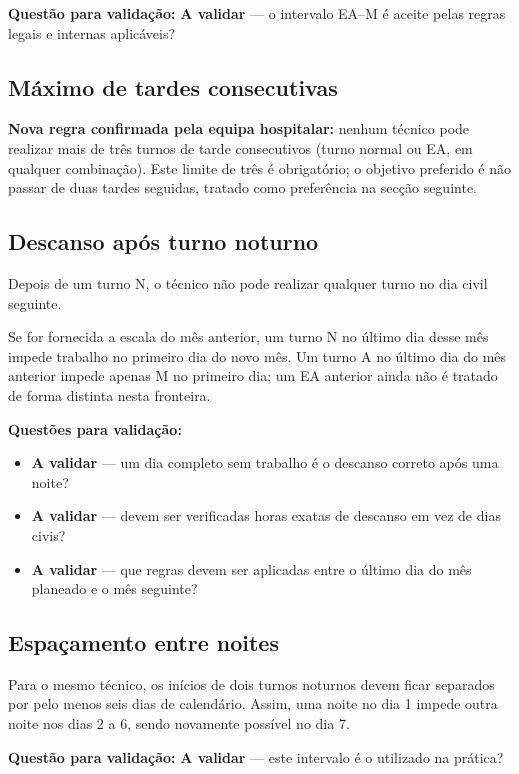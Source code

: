 \documentclass[11pt,a4paper]{article}
\newcommand{\validar}{\textcolor{blue!70!black}{\textbf{A validar}}}
\begin{document}
\textbf{Questão para validação:} \validar{} --- o intervalo EA--M é aceite pelas
regras legais e internas aplicáveis?

\subsection{Máximo de tardes consecutivas}

\textbf{Nova regra confirmada pela equipa hospitalar:} nenhum técnico pode
realizar mais de três turnos de tarde consecutivos (turno normal ou EA, em
qualquer combinação). Este limite de três é obrigatório; o objetivo preferido
é não passar de duas tardes seguidas, tratado como preferência na secção
seguinte.

\subsection{Descanso após turno noturno}

Depois de um turno N, o técnico não pode realizar qualquer turno no dia civil
seguinte.

Se for fornecida a escala do mês anterior, um turno N no último dia desse mês
impede trabalho no primeiro dia do novo mês. Um turno A no último dia do mês
anterior impede apenas M no primeiro dia; um EA anterior ainda não é tratado de
forma distinta nesta fronteira.

\textbf{Questões para validação:}
\begin{itemize}
    \item \validar{} --- um dia completo sem trabalho é o descanso correto após uma noite?
    \item \validar{} --- devem ser verificadas horas exatas de descanso em vez de dias civis?
    \item \validar{} --- que regras devem ser aplicadas entre o último dia do mês planeado e o mês seguinte?
\end{itemize}

\subsection{Espaçamento entre noites}

Para o mesmo técnico, os inícios de dois turnos noturnos devem ficar separados
por pelo menos seis dias de calendário. Assim, uma noite no dia 1 impede outra
noite nos dias 2 a 6, sendo novamente possível no dia 7.

\textbf{Questão para validação:} \validar{} --- este intervalo é o utilizado na prática?
\end{document}
